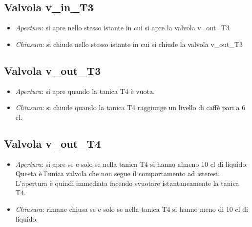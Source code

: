 \documentclass[12pt]{article}
\begin{document}
\subsection{Valvola v\_in\_T3}
\begin{itemize}
	\item \textit{Apertura}: si apre nello stesso istante in cui si apre la valvola v\_out\_T3
	\item \textit{Chiusura}: si chiude nello stesso istante in cui si chiude la valvola v\_out\_T3
\end{itemize}

\subsection{Valvola v\_out\_T3}
\begin{itemize}
	\item \textit{Apertura}: si apre quando la tanica T4 è vuota.
	\item \textit{Chiusura}: si chiude quando la tanica T4 raggiunge un livello di caffè pari a 6 cl.
\end{itemize}
	
\subsection{Valvola v\_out\_T4}
\begin{itemize}
	\item \textit{Apertura}: si apre se e solo se nella tanica T4 si hanno almeno 10 cl di liquido. Questa è l'unica valvola che non segue il comportamento ad isteresi. L'apertura è quindi immediata facendo svuotare istantaneamente la tanica T4.
	
	\item \textit{Chiusura}: rimane chiusa se e solo se nella tanica T4 si hanno meno di 10 cl di liquido.
\end{itemize}



\newpage
\end{document}
